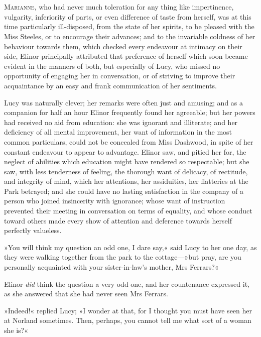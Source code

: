 \chapter[Chapter \thechapter]{}
\lettrine[lines=4,lraise=0.3]{M}{arianne}, who had never much toleration for any thing like impertinence, vulgarity, inferiority of parts, or even difference of taste from herself, was at this time particularly ill-disposed, from the state of her spirits, to be pleased with the Miss Steeles, or to encourage their advances; and to the invariable coldness of her behaviour towards them, which checked every endeavour at intimacy on their side, Elinor principally attributed that preference of herself which soon became evident in the manners of both, but especially of Lucy, who missed no opportunity of engaging her in conversation, or of striving to improve their acquaintance by an easy and frank communication of her sentiments.

Lucy was naturally clever; her remarks were often just and amusing; and as a companion for half an hour Elinor frequently found her agreeable; but her powers had received no aid from education: she was ignorant and illiterate; and her deficiency of all mental improvement, her want of information in the most common particulars, could not be concealed from Miss Dashwood, in spite of her constant endeavour to appear to advantage. Elinor saw, and pitied her for, the neglect of abilities which education might have rendered so respectable; but she saw, with less tenderness of feeling, the thorough want of delicacy, of rectitude, and integrity of mind, which her attentions, her assiduities, her flatteries at the Park betrayed; and she could have no lasting satisfaction in the company of a person who joined insincerity with ignorance; whose want of instruction prevented their meeting in conversation on terms of equality, and whose conduct toward others made every show of attention and deference towards herself perfectly valueless.

»You will think my question an odd one, I dare say,« said Lucy to her one day, as they were walking together from the park to the cottage—»but pray, are you personally acquainted with your sister-in-law’s mother, Mrs Ferrars?«

Elinor \textit{did} think the question a very odd one, and her countenance expressed it, as she answered that she had never seen Mrs Ferrars.

»Indeed!« replied Lucy; »I wonder at that, for I thought you must have seen her at Norland sometimes. Then, perhaps, you cannot tell me what sort of a woman she is?«

